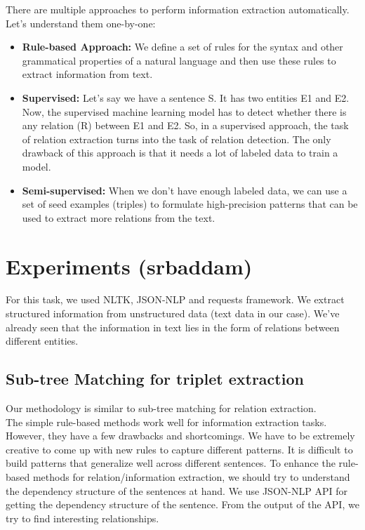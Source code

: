 \documentclass[11pt,letterpaper]{article}
\begin{document}
There are multiple approaches to perform information extraction automatically. Let’s understand them one-by-one:
\begin{itemize}
    \item \textbf{Rule-based Approach:} We define a set of rules for the syntax and other grammatical properties of a natural language and then use these rules to extract information from text. 
    \item \textbf{Supervised:} Let’s say we have a sentence S. It has two entities E1 and E2. Now, the supervised machine learning model has to detect whether there is any relation (R) between E1 and E2. So, in a supervised approach, the task of relation extraction turns into the task of relation detection. The only drawback of this approach is that it needs a lot of labeled data to train a model.
    \item \textbf{Semi-supervised:} When we don’t have enough labeled data, we can use a set of seed examples (triples) to formulate high-precision patterns that can be used to extract more relations from the text.

\end{itemize}

\section{Experiments (srbaddam)}
For this task, we used NLTK, JSON-NLP and requests framework. We extract structured information from unstructured data (text data in our case). We’ve already seen that the information in text lies in the form of relations between different entities. \subsection{Sub-tree Matching for triplet extraction}
Our methodology is similar to sub-tree matching for relation extraction.\\

The simple rule-based methods work well for information extraction tasks. However, they have a few drawbacks and shortcomings. We have to be extremely creative to come up with new rules to capture different patterns. It is difficult to build patterns that generalize well across different sentences. To enhance the rule-based methods for relation/information extraction, we should try to understand the dependency structure of the sentences at hand. We use JSON-NLP API for getting the dependency structure of the sentence. From the output of the API, we try to find interesting relationships. \\
\end{document}
